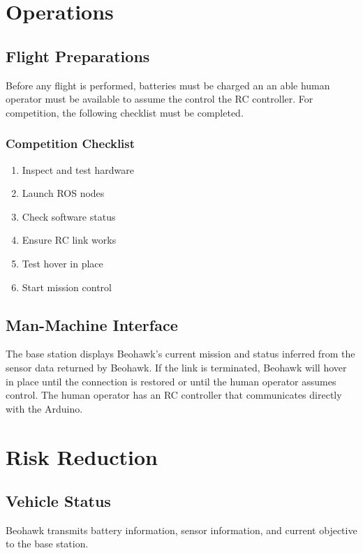 \documentclass[12pt, letterpaper]{article}
\begin{document}
\section{Operations}

\subsection{Flight Preparations}
Before any flight is performed, batteries must be charged an an able human operator must be available to assume the control the RC controller.  For competition, the following checklist must be completed.

\subsubsection{Competition Checklist}
\begin{enumerate}
  \item Inspect and test hardware
  \item Launch ROS nodes
  \item Check software status
  \item Ensure RC link works
  \item Test hover in place
  \item Start mission control
\end{enumerate}

\subsection{Man-Machine Interface}
The base station displays Beohawk's current mission and status inferred from the sensor data returned by Beohawk.  If the link is terminated, Beohawk will  hover in place until the connection is restored or until the human operator assumes control. The human operator has an RC controller that communicates directly with the Arduino.


\section{Risk Reduction}
\subsection{Vehicle Status}
Beohawk transmits battery information, sensor information, and current objective to the base station. 
\end{document}
